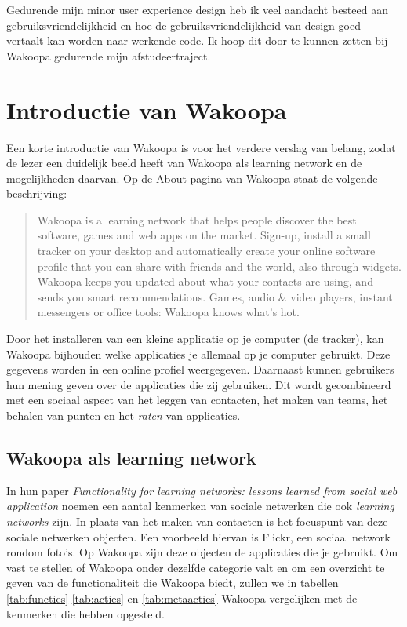 \documentclass[a4paper, 10pt, pdftex]{report}
\begin{document}
    Gedurende mijn minor user experience design heb ik veel aandacht besteed aan gebruiksvriendelijkheid en hoe de gebruiksvriendelijkheid van design goed vertaalt kan worden naar werkende code. Ik hoop dit door te kunnen zetten bij Wakoopa gedurende mijn afstudeertraject.




    \section{Introductie van Wakoopa}
      Een korte introductie van Wakoopa is voor het verdere verslag van belang, zodat de lezer een duidelijk beeld heeft van Wakoopa als learning network en de mogelijkheden daarvan. Op de About pagina van Wakoopa \citep{Gaal2007} staat de volgende beschrijving:
        \begin{quote} Wakoopa is a learning network that helps people discover the best software, games and web apps on the market. Sign-up, install a small tracker on your desktop and automatically create your online software profile that you can share with friends and the world, also through widgets. Wakoopa keeps you updated about what your contacts are using, and sends you smart recommendations. Games, audio \& video players, instant messengers or office tools: Wakoopa knows what's hot.
        \end{quote}
      Door het installeren van een kleine applicatie op je computer (de tracker), kan Wakoopa bijhouden welke applicaties je allemaal op je computer gebruikt. Deze gegevens worden in een online profiel weergegeven. Daarnaast kunnen gebruikers hun mening geven over de applicaties die zij gebruiken. Dit wordt gecombineerd met een sociaal aspect van het leggen van contacten, het maken van teams, het behalen van punten en het \emph{raten} van applicaties.

        \subsection{Wakoopa als learning network}
        In hun paper \emph{Functionality for learning networks: lessons learned from social web application} noemen \citeauthor{Berlanga2007} een aantal kenmerken van sociale netwerken die ook \emph{learning networks} zijn. In plaats van het maken van contacten is het focuspunt van deze sociale netwerken objecten. Een voorbeeld hiervan is Flickr, een sociaal network rondom foto's. Op Wakoopa zijn deze objecten de applicaties die je gebruikt. Om vast te stellen of Wakoopa onder dezelfde categorie valt en om een overzicht te geven van de functionaliteit die Wakoopa biedt, zullen we in tabellen \ref{tab:functies} \ref{tab:acties} en \ref{tab:metaacties} \label{learningnetwork} Wakoopa vergelijken met de kenmerken die \citeauthor{Berlanga2007} hebben opgesteld.
\end{document}
